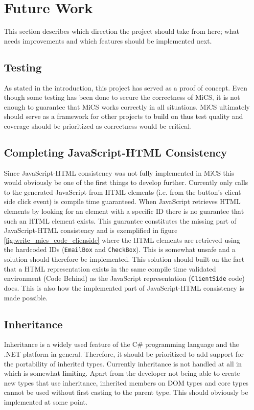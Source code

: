 
\section{Future Work}
\label{sec:futurework}
This section describes which direction the project should take from here; what needs improvements and which features should be implemented next.

\subsection{Testing} %
\label{sub:fw_testing}
	As stated in the introduction, this project has served as a proof of concept. Even though some testing has been done to secure the correctness of MiCS, it is not enough to guarantee that MiCS works correctly in all situations. MiCS ultimately should serve as a framework for other projects to build on thus test quality and coverage should be prioritized as correctness would be critical.

\subsection{Completing JavaScript-HTML Consistency} %
\label{sub:completing_javascript_html_consistency}
	Since JavaScript-HTML consistency was not fully implemented in MiCS this would obviously be one of the first things to develop further. Currently only calls to the generated JavaScript from HTML elements (i.e. from the button’s client side click event) is compile time guaranteed. When JavaScript retrieves HTML elements by looking for an element with a specific ID there is no guarantee that such an HTML element exists. This guarantee constitutes the missing part of JavaScript-HTML consistency and is exemplified in figure \ref{fig:write_mics_code_clienside} where the HTML elements are retrieved using the hardcoded IDs (\texttt{EmailBox} and \texttt{CheckBox}). This is somewhat unsafe and a solution should therefore be implemented. This solution should built on the fact that a HTML representation exists in the same compile time validated environment (Code Behind) as the JavaScript representation (\texttt{ClientSide} code) does. This is also how the implemented part of JavaScript-HTML consistency is made possible.

\subsection{Inheritance} %
\label{sub:fw_inheritance}
	Inheritance is a widely used feature of the C\# programming language and the .NET platform in general. Therefore, it should be prioritized to add support for the portability of inherited types. Currently inheritance is not handled at all in which is somewhat limiting. Apart from the developer not being able to create new types that use inheritance, inherited members on DOM types and core types cannot be used without first casting to the parent type. This should obviously be implemented at some point.


